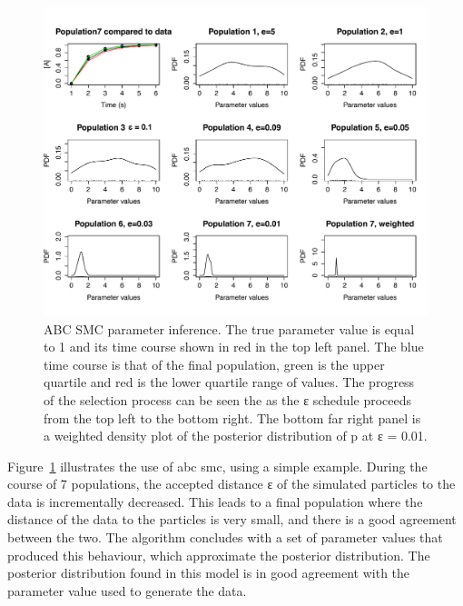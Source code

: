 \begin{figure}[htbp]
    \begin{center}
    \includegraphics[scale=0.6]{../../chapters/chapterIntroduction/images/abc_smc_example.pdf}
    \caption[\acrshort{abc} \acrshort{smc} parameter inference example]{ABC SMC parameter inference. The true parameter value is equal to 1 and its time course shown in red in the top left panel. The blue time course is that of the final population, green is the upper quartile and red is the lower quartile range of values. The progress of the selection process can be seen the as the ε schedule proceeds from the top left to the bottom right. The bottom far right panel is a weighted density plot of the posterior distribution of p at ε = 0.01.}
    \label{fig:myABC true 1}
    \end{center}
\end{figure}


Figure~\ref{fig:myABC true 1} illustrates the use of \acrshort{abc} \acrshort{smc}, using a simple example. During the course of 7 populations, the accepted distance ε of the simulated particles to the data is incrementally decreased. This leads to a final population where the distance of the data to the particles is very small, and there is a good agreement between the two. The algorithm concludes with a set of parameter values that produced this behaviour, which approximate the posterior distribution. The posterior distribution found in this model is in good agreement with the parameter value used to generate the data. 

